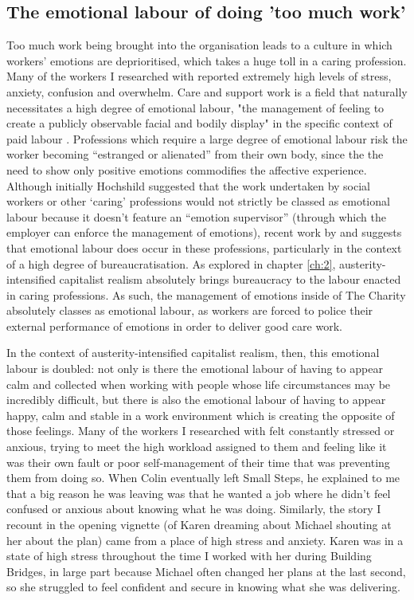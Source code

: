 \subsection{The emotional labour of doing 'too much work'}
Too much work being brought into the organisation leads to a culture in which workers' emotions are deprioritised, which takes a huge toll in a caring profession. Many of the workers I researched with reported extremely high levels of stress, anxiety, confusion and overwhelm. Care and support work is a field that naturally necessitates a high degree of emotional labour, "the management of feeling to create a publicly observable facial and bodily display" in the specific context of paid labour \citep[7]{hochschild_managed_2012}. Professions which require a large degree of emotional labour risk the worker becoming “estranged or alienated” from their own body, since the the need to show only positive emotions commodifies the affective experience. Although initially Hochshild suggested that the work undertaken by social workers or other ‘caring’ professions would not strictly be classed as emotional labour because it doesn’t feature an “emotion supervisor” (through which the employer can enforce the management of emotions), recent work by \citet{leeson_emotional_2010} and \citet{winter_emotional_2019} suggests that emotional labour does occur in these professions, particularly in the context of a high degree of bureaucratisation. As explored in chapter \ref{ch:2}, austerity-intensified capitalist realism absolutely brings bureaucracy to the labour enacted in caring professions. As such, the management of emotions inside of The Charity absolutely classes as emotional labour, as workers are forced to police their external performance of emotions in order to deliver good care work.

In the context of austerity-intensified capitalist realism, then, this emotional labour is doubled: not only is there the emotional labour of having to appear calm and collected when working with people whose life circumstances may be incredibly difficult, but there is also the emotional labour of having to appear happy, calm and stable in a work environment which is creating the opposite of those feelings. Many of the workers I researched with felt constantly stressed or anxious, trying to meet the high workload assigned to them and feeling like it was their own fault or poor self-management of their time that was preventing them from doing so. When Colin eventually left Small Steps, he explained to me that a big reason he was leaving was that he wanted a job where he didn't feel confused or anxious about knowing what he was doing. Similarly, the story I recount in the opening vignette (of Karen dreaming about Michael shouting at her about the plan) came from a place of high stress and anxiety. Karen was in a state of high stress throughout the time I worked with her during Building Bridges, in large part because Michael often changed her plans at the last second, so she struggled to feel confident and secure in knowing what she was delivering.

